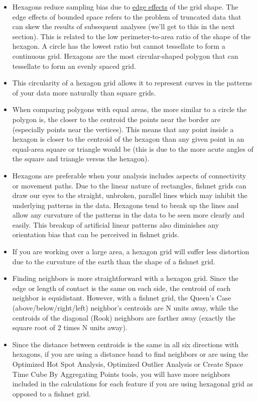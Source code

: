 \documentclass[
]{book}
\providecommand{\tightlist}{%
  \setlength{\itemsep}{0pt}\setlength{\parskip}{0pt}}
\begin{document}
\begin{itemize}
\tightlist
\item
  Hexagons reduce sampling bias due to \href{https://link.springer.com/chapter/10.1007/978-0-387-09688-9_5}{edge effects} of the grid shape. The edge effects of bounded space refers to the problem of truncated data that can skew the results of subsequent analyses (we'll get to this in the next section). This is related to the low perimeter-to-area ratio of the shape of the hexagon. A circle has the lowest ratio but cannot tessellate to form a continuous grid. Hexagons are the most circular-shaped polygon that can tessellate to form an evenly spaced grid.
\item
  This circularity of a hexagon grid allows it to represent curves in the patterns of your data more naturally than square grids.
\item
  When comparing polygons with equal areas, the more similar to a circle the polygon is, the closer to the centroid the points near the border are (especially points near the vertices). This means that any point inside a hexagon is closer to the centroid of the hexagon than any given point in an equal-area square or triangle would be (this is due to the more acute angles of the square and triangle versus the hexagon).
\item
  Hexagons are preferable when your analysis includes aspects of connectivity or movement paths. Due to the linear nature of rectangles, fishnet grids can draw our eyes to the straight, unbroken, parallel lines which may inhibit the underlying patterns in the data. Hexagons tend to break up the lines and allow any curvature of the patterns in the data to be seen more clearly and easily. This breakup of artificial linear patterns also diminishes any orientation bias that can be perceived in fishnet grids.
\item
  If you are working over a large area, a hexagon grid will suffer less distortion due to the curvature of the earth than the shape of a fishnet grid.
\item
  Finding neighbors is more straightforward with a hexagon grid. Since the edge or length of contact is the same on each side, the centroid of each neighbor is equidistant. However, with a fishnet grid, the Queen's Case (above/below/right/left) neighbor's centroids are N units away, while the centroids of the diagonal (Rook) neighbors are farther away (exactly the square root of 2 times N units away).
\item
  Since the distance between centroids is the same in all six directions with hexagons, if you are using a distance band to find neighbors or are using the Optimized Hot Spot Analysis, Optimized Outlier Analysis or Create Space Time Cube By Aggregating Points tools, you will have more neighbors included in the calculations for each feature if you are using hexagonal grid as opposed to a fishnet grid.
\end{itemize}
\end{document}
